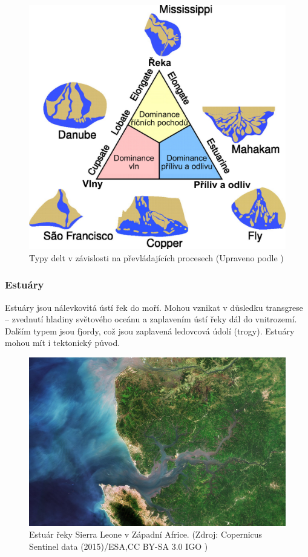 \begin{figure}[h]
	\centering
	\includegraphics[width=1\linewidth]{obrazky/fluvial/delty}
	\caption{Typy delt v závislosti na převládajících procesech (Upraveno podle \textcite{seyboldModelingRiverDelta2007})}
	\label{fig:delty}
\end{figure}

\subsubsection{Estuáry}
Estuáry jsou nálevkovitá ústí řek do moří. Mohou vznikat v důsledku transgrese -- zvednutí hladiny světového oceánu a zaplavením ústí řeky dál do vnitrozemí. Dalším typem jsou fjordy, což jsou zaplavená ledovcová údolí (trogy). Estuáry mohou mít i tektonický původ. 

\begin{figure}[h]
	\centering
	\includegraphics[width=1\linewidth]{obrazky/marine/estuary}
	\caption{Estuár řeky Sierra Leone v Západní Africe. (Zdroj: Copernicus Sentinel data (2015)/ESA,CC BY-SA 3.0 IGO )}
	\label{fig:estuary}
\end{figure}

